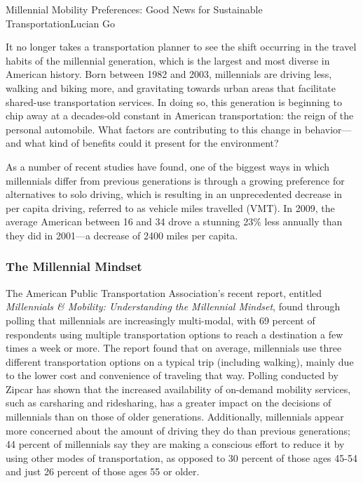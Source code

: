 \documentclass{papertex}
\begin{document}
\begin{news}{2}{Millennial Mobility Preferences: Good News for Sustainable Transportation}{Lucian Go}{}{}

It no longer takes a transportation planner to see the shift occurring in the 
travel habits of the millennial generation, which is the largest and most 
diverse in American history. Born between 1982 and 2003, millennials are 
driving less, walking and biking more, and gravitating towards urban areas 
that facilitate shared-use transportation services. In doing so, this 
generation is beginning to chip away at a decades-old constant in American 
transportation: the reign of the personal automobile. What factors are 
contributing to this change in behavior—and what kind of benefits could it 
present for the environment?

As a number of recent studies have found, one of the biggest ways in which 
millennials differ from previous generations is through a growing preference 
for alternatives to solo driving, which is resulting in an unprecedented 
decrease in per capita driving, referred to as vehicle miles travelled (VMT). 
In 2009, the average American between 16 and 34 drove a stunning 23\% less 
annually than they did in 2001—a decrease of 2400 miles per capita.

\subsubsection*{The Millennial Mindset}

The American Public Transportation Association’s recent report, entitled 
\emph{Millennials \& Mobility: Understanding the Millennial Mindset}, found 
through polling that millennials are increasingly multi-modal, with 69 percent 
of respondents using multiple transportation options to reach a destination a 
few times a week or more. The report found that on average, millennials use 
three different transportation options on a typical trip (including walking), 
mainly due to the lower cost and convenience of traveling that way. Polling 
conducted by Zipcar has shown that the increased availability of on-demand 
mobility services, such as carsharing and ridesharing, has a greater impact 
on the decisions of millennials than on those of older generations. 
Additionally, millennials appear more concerned about the amount of driving 
they do than previous generations; 44 percent of millennials say they are 
making a conscious effort to reduce it by using other modes of transportation, 
as opposed to 30 percent of those ages 45-54 and just 26 percent of those 
ages 55 or older.


\end{news}
\end{document}
